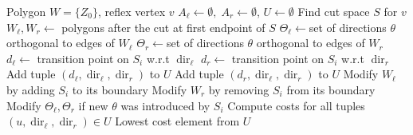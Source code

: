 \documentclass[../main.tex]{subfiles}
\begin{document}
\begin{algorithm}
	\caption{$\operatorname{find\_optimal\_cut}(W, v)$}
	\label{alg:optimal_cut}
	\begin{algorithmic}[1]
		\REQUIRE Polygon $W=\{Z_0\}$, reflex vertex $v$
			\STATE $A_{\ell}\gets\emptyset,\;A_r\gets\emptyset$, $U\gets\emptyset$
			\STATE Find cut space $S$ for $v$	\label{line:algo_cut_space}
			\STATE $W_{\ell},W_r\gets$ polygons after the cut at first endpoint of $S$ \label{line:cut_two_polygons}
			\STATE $\Theta_{\ell}\gets$set of directions $\theta$ orthogonal to edges of $W_{\ell}$ \label{line:cut_two_sets}
			\STATE $\Theta_r\gets$set of directions $\theta$ orthogonal to edges of $W_r$ \label{line:cut_two_sets_2}
			 \label{line:opt_cut_for}
						\STATE $d_{\ell}\gets$ transition point on $S_i$ w.r.t $\operatorname{dir}_{\ell}$	\label{line:cand_trans_pt} 
						\STATE $d_r\gets$ transition point on $S_i$ w.r.t $\operatorname{dir}_r$ \label{line:cand_trans_pt_2}						
						\STATE Add tuple $(d_{\ell}, \operatorname{dir}_{\ell}, \operatorname{dir}_r)$ to $U$
						\STATE Add tuple $(d_r, \operatorname{dir}_{\ell}, \operatorname{dir}_r)$ to $U$
					\ENDFOR
				\ENDFOR
				\STATE Modify $W_{\ell}$ by adding $S_i$ to its boundary \label{line:cut_modify_1}
				\STATE Modify $W_r$ by removing $S_i$ from its boundary \label{line:cut_modify_2}
				\STATE Modify $\Theta_{\ell},\Theta_r$ if new $\theta$ was introduced by $S_i$ \label{line:opt_cut_end_for}
			\ENDFOR 
			\STATE Compute costs for all tuples $(u, \operatorname{dir}_{\ell}, \operatorname{dir}_r)\in U$ \label{line:sort_tuples}
			\RETURN Lowest cost element from $U$
	\end{algorithmic}
\end{algorithm}
\end{document}
